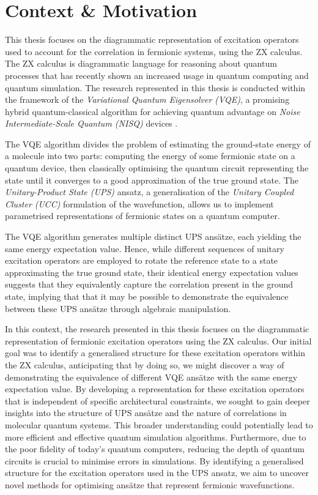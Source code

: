 \section{Context \& Motivation}%
\label{context-motivation}

This thesis focuses on the diagrammatic representation of excitation operators used to account for the correlation in fermionic systems, using the ZX calculus. The ZX calculus is diagrammatic language for reasoning about quantum processes \cite{Coecke2011} that has recently shown an increased usage in quantum computing and quantum simulation. The research represented in this thesis is conducted within the framework of the \textit{Variational Quantum Eigensolver (VQE)}, a promising hybrid quantum-classical algorithm for achieving quantum advantage on \textit{Noise Intermediate-Scale Quantum (NISQ)} devices \cite{Cerezo2020}.

The VQE algorithm divides the problem of estimating the ground-state energy of a molecule into two parts: computing the energy of some fermionic state on a quantum device, then classically optimising the quantum circuit representing the state until it converges to a good approximation of the true ground state. The \textit{Unitary-Product State (UPS)} ansatz, a generalisation of the \textit{Unitary Coupled Cluster (UCC)} formulation of the wavefunction, allows us to implement parametrised representations of fermionic states on a quantum computer.

The VQE algorithm generates multiple distinct UPS ansätze, each yielding the same energy expectation value. Hence, while different sequences of unitary excitation operators are employed to rotate the reference state to a state approximating the true ground state, their identical energy expectation values suggests that they equivalently capture the correlation present in the ground state, implying that that it may be possible to demonstrate the equivalence between these UPS ansätze through algebraic manipulation.

In this context, the research presented in this thesis focuses on the diagrammatic representation of fermionic excitation operators using the ZX calculus. Our initial goal was to identify a generalised structure for these excitation operators within the ZX calculus, anticipating that by doing so, we might discover a way of demonstrating the equivalence of different VQE ansätze with the same energy expectation value. By developing a representation for these excitation operators that is independent of specific architectural constraints, we sought to gain deeper insights into the structure of UPS ansätze and the nature of correlations in molecular quantum systems. This broader understanding could potentially lead to more efficient and effective quantum simulation algorithms. Furthermore, due to the poor fidelity of today's quantum computers, reducing the depth of quantum circuits is crucial to minimise errors in simulations. By identifying a generalised structure for the excitation operators used in the UPS ansatz, we aim to uncover novel methods for optimising ansätze that represent fermionic wavefunctions.

